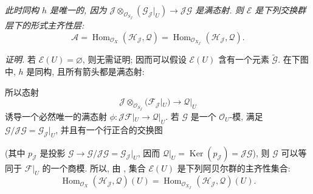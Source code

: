 \textit{此时同构 \(h\) 是唯一的, 因为
\(
 \mathscr J\otimes_{\mathscr O_{S_{\mathscr J}}}
 (\mathscr G_{\mathscr J}|_U)\to\mathscr J\mathscr G
\)
是满态射. 则 \(\mathcal E\) 是下列交换群层下的形式主齐性层:
\[
 \mathscr A=
 \operatorname{Hom}_{\mathscr O_X}(\mathscr H_{\mathscr J},\mathscr Q)
 =\operatorname{Hom}_{\mathscr O_{X_{\mathscr J}}}
   (\mathscr H_{\mathscr J},\mathscr Q).
\]}

\noindent\textit{证明.}
若 \(\mathcal E(U)=\varnothing\), 则无需证明;
因而可以假设 \(\mathcal E(U)\) 含有一个元素
\(\widetilde{\mathscr G}\).
在下图中, \(h\) 是同构, 且所有箭头都是满态射:

\begin{center}
\end{center}

所以态射
\[
 \mathscr J\otimes_{\mathscr O_{S_{\mathscr J}}}
 (\mathscr F_{\mathscr J}|_U)\longrightarrow\mathscr Q|_U
\]
诱导一个必然唯一的满态射
\(\phi:\mathscr J\mathscr F|_U\to\mathscr Q|_U\).
若 \(\mathscr G\) 是一个 \(\mathscr O_U\)-模, 满足
\(\mathscr G/\mathscr J\mathscr G=\mathscr G_{\mathscr J}|_U\),
并且有一个行正合的交换图

\begin{center}
\end{center}

\noindent(其中 \(p_{\mathscr J}\) 是投影
\(\mathscr G\to\mathscr G/\mathscr J\mathscr G
=\mathscr G_{\mathscr J}|_U\), 因而
\(\mathscr Q|_U=\operatorname{Ker}(p_{\mathscr J})
=\mathscr J\mathscr G\)), 则 \(\mathscr G\) 可以等同于
\(\mathscr F|_U\) 的一个商模.
所以, 由 ,
集合 \(\mathcal E(U)\) 是下列阿贝尔群的主齐性集合:
\[
 \operatorname{Hom}_{\mathscr O_X}
  (\mathscr H_{\mathscr J},\mathscr Q)(U)
 =\operatorname{Hom}_{\mathscr O_{X_{\mathscr J}}}
  (\mathscr H_{\mathscr J},\mathscr Q)(U).
\]


